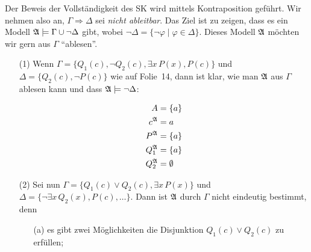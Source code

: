 \documentclass[fontsize=11pt, twoside=false, numbers=autoenddot]{scrbook}
\begin{document}
Der Beweis der Vollständigkeit des SK wird mittels Kontraposition geführt.
Wir nehmen also an, $\Gamma \Rightarrow \Delta$ sei \emph{nicht ableitbar}.
Das Ziel ist zu zeigen, dass es ein Modell $\mathfrak{A} \models \Gamma \cup \lnot \Delta$ gibt,
wobei $\lnot \Delta = \{\lnot \varphi \mid \varphi \in \Delta\}$.
Dieses Modell $\mathfrak{A}$ möchten wir gern aus $\Gamma$ "`ablesen"'.

\begin{enumerate}
  \item[(1)]
    Wenn $\Gamma = \{Q_1(c), \lnot Q_2(c), \exists x\,P(x), P(c)\}$
    und $\Delta = \{Q_2(c), \lnot P(c)\}$
    wie auf Folie~14,
    dann ist klar, wie man $\mathfrak{A}$ aus $\Gamma$ ablesen kann und dass $\mathfrak{A} \models \lnot \Delta$:
    \par\vspace*{-\baselineskip}
    \begin{center}
      \parbox{.2\textwidth}{%
        \begin{align*}
          A        & = \{a\} \\
          c^\mathfrak{A}   & = a     \\
          P^\mathfrak{A}   & = \{a\} \\
          Q_1^\mathfrak{A} & = \{a\} \\
          Q_2^\mathfrak{A} & = \emptyset
        \end{align*}
      }
      \hspace*{.1\textwidth}
      \parbox{.2\textwidth}{%
      }
    \end{center}
  \item[(2)]
    Sei nun $\Gamma = \{Q_1(c) \lor Q_2(c), \exists x\,P(x)\}$
    und $\Delta = \{\lnot \exists x\,Q_2(x), P(c), \dots\}$.
    Dann ist $\mathfrak{A}$ durch $\Gamma$ nicht eindeutig bestimmt,
    denn
    \begin{enumerate}
      \item[(a)]
        es gibt zwei Möglichkeiten die Disjunktion $Q_1(c) \lor Q_2(c)$ zu erfüllen;

\end{enumerate}
\end{enumerate}
\end{document}
